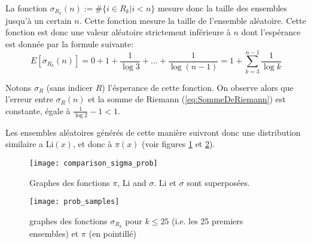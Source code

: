 \documentclass[../main.tex]{report}
\begin{document}
La fonction $\sigma_{R_k}(n) := \# \{i \in R_{k} | i < n\}$ mesure donc la taille des ensembles jusqu'à un certain $n$. Cette fonction mesure la taille de l'ensemble aléatoire. 
Cette fonction est donc une valeur aléatoire strictement inférieure à $n$ dont l'espérance est donnée par la formule suivante:
\begin{equation}
\label{eq:esperance}
E[\sigma_{R_k}(n)] = 0 + 1 + \frac{1}{\log 3} + ... + \frac{1}{\log (n-1)}
= 1 + \sum_{k=3}^{n-1} \frac{1}{\log k}
\end{equation}

Notons $\sigma_R$ (sans indicer $R$) l'ésperance de cette fonction.
On observe alors que l'erreur entre $\sigma_R(n)$ et la somme de Riemann (\ref{eq:SommeDeRiemann}) est constante, égale à
$\frac{1}{\log 2}- 1 < 1$.

Les ensembles aléatoires générés de cette manière suivront donc une distribution similaire a Li$(x)$, et donc à $\pi(x)$
(voir figures \ref{fig:comparison_sigma_prob} et \ref{fig:prob_sample}).

\begin{figure}[H]
\texttt{[image: comparison\_sigma\_prob]}

\caption{Graphes des fonctions $\pi$, Li and $\sigma$. Li et $\sigma$ sont superposées.}
\label{fig:comparison_sigma_prob}
\end{figure}

\begin{figure}[H]
	\centering
	\texttt{[image: prob\_samples]}
	\caption{graphes des fonctions $\sigma_{R_k}$ pour $k \leq 25$ (i.e. les 25 premiers ensembles) et $\pi$ (en pointillé)}
	\label{fig:prob_sample}
\end{figure}
\end{document}
